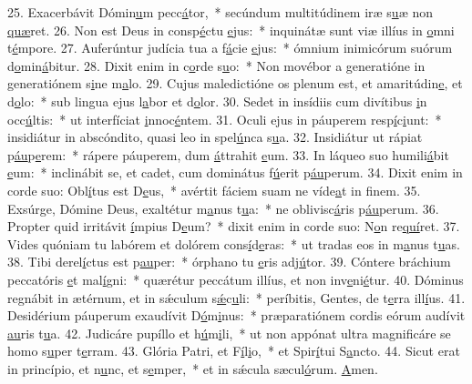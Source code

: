 25. Exacerbávit Dómin\uline{u}m pecc\uline{á}tor,~* secúndum multitúdinem iræ s\uline{u}æ non \uline{quæ}ret.
26. Non est Deus in consp\uline{é}ctu \uline{e}jus:~* inquinátæ sunt viæ illíus in \uline{o}mni t\uline{é}mpore.
27. Auferúntur judícia tua a f\uline{á}cie \uline{e}jus:~* ómnium inimicórum suórum d\uline{o}min\uline{á}bitur.
28. Dixit enim in c\uline{o}rde s\uline{u}o:~* Non movébor a generatióne in generatiónem s\uline{i}ne m\uline{a}lo.
29. Cujus maledictióne os plenum est, et amaritúdin\uline{e}, et d\uline{o}lo:~* sub lingua ejus l\uline{a}bor et d\uline{o}lor.
30. Sedet in insídiis cum divítibus \uline{i}n occ\uline{ú}ltis:~* ut interfíciat \uline{i}nnoc\uline{é}ntem.
31. Oculi ejus in páuperem resp\uline{í}c\uline{i}unt:~* insidiátur in abscóndito, quasi leo in spel\uline{ú}nca s\uline{u}a.
32. Insidiátur ut rápiat p\uline{áu}p\uline{e}rem:~* rápere páuperem, dum \uline{á}ttrahit \uline{e}um.
33. In láqueo suo humili\uline{á}bit \uline{e}um:~* inclinábit se, et cadet, cum dominátus f\uline{ú}erit p\uline{áu}perum.
34. Dixit enim in corde suo: Obl\uline{í}tus est D\uline{e}us,~* avértit fáciem suam ne víde\uline{a}t in f\uline{i}nem.
35. Exsúrge, Dómine Deus, exaltétur m\uline{a}nus t\uline{u}a:~* ne oblivisc\uline{á}ris p\uline{áu}perum.
36. Propter quid irritávit \uline{í}mpius D\uline{e}um?~* dixit enim in corde suo: N\uline{o}n re\uline{quí}ret.
37. Vides quóniam tu labórem et dolórem cons\uline{í}d\uline{e}ras:~* ut tradas eos in m\uline{a}nus t\uline{u}as.
38. Tibi derel\uline{í}ctus est p\uline{au}per:~* órphano tu \uline{e}ris adj\uline{ú}tor.
39. Cóntere bráchium peccatóris \uline{e}t mal\uline{í}gni:~* quærétur peccátum illíus, et non inv\uline{e}ni\uline{é}tur.
40. Dóminus regnábit in ætérnum, et in sǽculum s\uline{ǽ}c\uline{u}li:~* períbitis, Gentes, de t\uline{e}rra ill\uline{í}us.
41. Desidérium páuperum exaudívit D\uline{ó}m\uline{i}nus:~* præparatiónem cordis eórum audívit \uline{au}ris t\uline{u}a.
42. Judicáre pupíllo et h\uline{ú}m\uline{i}li,~* ut non appónat ultra magnificáre se homo s\uline{u}per t\uline{e}rram.
43. Glória Patri, et F\uline{í}l\uline{i}o,~* et Spir\uline{í}tui S\uline{a}ncto.
44. Sicut erat in princípio, et n\uline{u}nc, et s\uline{e}mper,~* et in sǽcula sæcul\uline{ó}rum. \uline{A}men.
